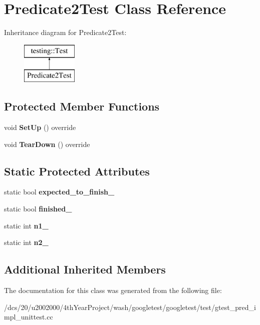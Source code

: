 \hypertarget{classPredicate2Test}{}\section{Predicate2\+Test Class Reference}
\label{classPredicate2Test}
Inheritance diagram for Predicate2\+Test\+:\begin{figure}[H]
\begin{center}
\leavevmode
\includegraphics[height=2.000000cm]{classPredicate2Test}
\end{center}
\end{figure}
\subsection*{Protected Member Functions}
\begin{DoxyCompactItemize}
\item 
\mbox{\label{classPredicate2Test_a18b81bef55647028d072d59dea11055f}} 
void {\bfseries Set\+Up} () override
\item 
\mbox{\label{classPredicate2Test_ad1092fca5badfb925a576949f63e872b}} 
void {\bfseries Tear\+Down} () override
\end{DoxyCompactItemize}
\subsection*{Static Protected Attributes}
\begin{DoxyCompactItemize}
\item 
\mbox{\label{classPredicate2Test_a56cf1f0f556addd9a62e0644dc1a86fc}} 
static bool {\bfseries expected\+\_\+to\+\_\+finish\+\_\+}
\item 
\mbox{\label{classPredicate2Test_a30f4ef76d3004253078e767e5c653b85}} 
static bool {\bfseries finished\+\_\+}
\item 
\mbox{\label{classPredicate2Test_ac002d8e279b24e75906fd19973fc2170}} 
static int {\bfseries n1\+\_\+}
\item 
\mbox{\label{classPredicate2Test_a9dbe5173570b9b911af2df889c287027}} 
static int {\bfseries n2\+\_\+}
\end{DoxyCompactItemize}
\subsection*{Additional Inherited Members}


The documentation for this class was generated from the following file\+:\begin{DoxyCompactItemize}
\item 
/dcs/20/u2002000/4th\+Year\+Project/wash/googletest/googletest/test/gtest\+\_\+pred\+\_\+impl\+\_\+unittest.\+cc\end{DoxyCompactItemize}

